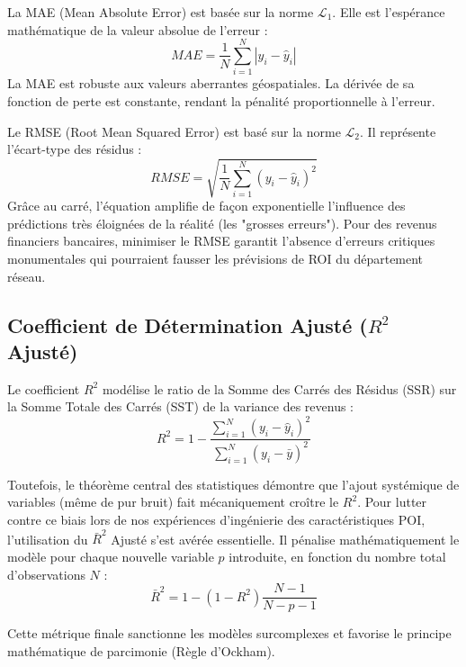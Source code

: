 \documentclass[11pt,a4paper,twoside]{report}
\begin{document}
La MAE (Mean Absolute Error) est basée sur la norme $\mathcal{L}_1$. Elle est l'espérance mathématique de la valeur absolue de l'erreur :
\begin{equation}
MAE = \frac{1}{N} \sum_{i=1}^{N} | y_i - \hat{y}_i |
\end{equation}
La MAE est robuste aux valeurs aberrantes géospatiales. La dérivée de sa fonction de perte est constante, rendant la pénalité proportionnelle à l'erreur.

Le RMSE (Root Mean Squared Error) est basé sur la norme $\mathcal{L}_2$. Il représente l'écart-type des résidus :
\begin{equation}
RMSE = \sqrt{\frac{1}{N} \sum_{i=1}^{N} (y_i - \hat{y}_i)^2}
\end{equation}
Grâce au carré, l'équation amplifie de façon exponentielle l'influence des prédictions très éloignées de la réalité (les "grosses erreurs"). Pour des revenus financiers bancaires, minimiser le RMSE garantit l'absence d'erreurs critiques monumentales qui pourraient fausser les prévisions de ROI du département réseau.

\subsection{Coefficient de Détermination Ajusté ($R^2$ Ajusté)}

Le coefficient $R^2$ modélise le ratio de la Somme des Carrés des Résidus (SSR) sur la Somme Totale des Carrés (SST) de la variance des revenus :
\begin{equation}
R^2 = 1 - \frac{\sum_{i=1}^{N} (y_i - \hat{y}_i)^2}{\sum_{i=1}^{N} (y_i - \bar{y})^2}
\end{equation}

Toutefois, le théorème central des statistiques démontre que l'ajout systémique de variables (même de pur bruit) fait mécaniquement croître le $R^2$. Pour lutter contre ce biais lors de nos expériences d'ingénierie des caractéristiques POI, l'utilisation du $\bar{R}^2$ Ajusté s'est avérée essentielle. Il pénalise mathématiquement le modèle pour chaque nouvelle variable $p$ introduite, en fonction du nombre total d'observations $N$ :
\begin{equation}
\bar{R}^2 = 1 - (1 - R^2) \frac{N - 1}{N - p - 1}
\end{equation}

Cette métrique finale sanctionne les modèles surcomplexes et favorise le principe mathématique de parcimonie (Règle d'Ockham).
\end{document}
